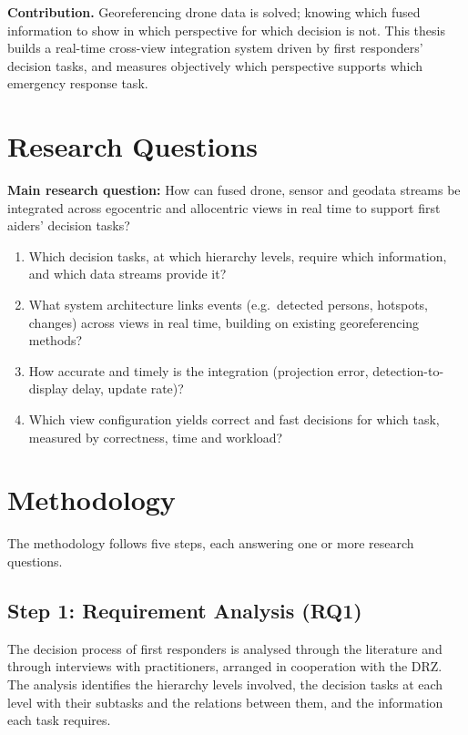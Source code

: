 \documentclass{article}
\begin{document}
\textbf{Contribution.}
Georeferencing drone data is solved; knowing which fused information to show in which perspective for which decision is not.
This thesis builds a real-time cross-view integration system driven by first responders' decision tasks, and measures objectively which perspective supports which emergency response task.

\section{Research Questions}
\textbf{Main research question:} How can fused drone, sensor and geodata streams be integrated across egocentric and allocentric views in real time to support first aiders' decision tasks?

\begin{enumerate}[label=\textbf{RQ\arabic*}]
  \item Which decision tasks, at which hierarchy levels, require which information, and which data streams provide it?
  \item What system architecture links events (e.g.\ detected persons, hotspots, changes) across views in real time, building on existing georeferencing methods?
  \item How accurate and timely is the integration (projection error, detection-to-display delay, update rate)?
  \item Which view configuration yields correct and fast decisions for which task, measured by correctness, time and workload?
\end{enumerate}

\section{Methodology}
The methodology follows five steps, each answering one or more research questions.

\subsection{Step 1: Requirement Analysis (RQ1)}
The decision process of first responders is analysed through the literature \cite{murphy2014disaster, kruijff2021, surmann2024} and through interviews with practitioners, arranged in cooperation with the DRZ.
The analysis identifies the hierarchy levels involved, the decision tasks at each level with their subtasks and the relations between them, and the information each task requires.
\end{document}
